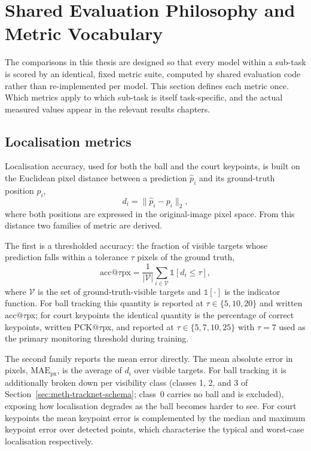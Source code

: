 \section{Shared Evaluation Philosophy and Metric Vocabulary}
\label{sec:meth-metrics}

The comparisons in this thesis are designed so that every model within a
sub-task is scored by an identical, fixed metric suite, computed by shared
evaluation code rather than re-implemented per model. This section defines each
metric once. Which metrics apply to which sub-task is itself task-specific, and
the actual measured values appear in the relevant results chapters. 

\subsection{Localisation metrics}
\label{sec:meth-metrics-loc}

Localisation accuracy, used for both the ball and the court keypoints, is built
on the Euclidean pixel distance between a prediction $\hat{p}_i$ and its
ground-truth position $p_i$,
\begin{equation}
  d_i = \lVert \hat{p}_i - p_i \rVert_2,
  \label{eq:pixdist}
\end{equation}
where both positions are expressed in the original-image pixel space. From this
distance two families of metric are derived.

The first is a thresholded accuracy: the fraction of visible targets whose
prediction falls within a tolerance $\tau$ pixels of the ground truth,
\begin{equation}
  \mathrm{acc@}\tau\mathrm{px} = \frac{1}{|\mathcal{V}|}\sum_{i \in \mathcal{V}}
  \mathbb{1}\!\left[ d_i \le \tau \right],
  \label{eq:accthr}
\end{equation}
where $\mathcal{V}$ is the set of ground-truth-visible targets and
$\mathbb{1}[\cdot]$ is the indicator function. For ball tracking this quantity
is reported at $\tau \in \{5, 10, 20\}$ and written $\mathrm{acc@}\tau$px; for
court keypoints the identical quantity is the percentage of correct keypoints,
written $\mathrm{PCK@}\tau$px, and reported at $\tau \in \{5, 7, 10, 25\}$ with
$\tau = 7$ used as the primary monitoring threshold during training.

The second family reports the mean error directly. The mean absolute error in
pixels, $\mathrm{MAE_{px}}$, is the average of $d_i$ over visible targets. For
ball tracking it is additionally broken down per visibility class (classes 1, 2,
and 3 of Section~\ref{sec:meth-tracknet-schema}; class~0 carries no ball and is
excluded), exposing how localisation degrades as the ball becomes harder to see.
For court keypoints the mean keypoint error is complemented by the median and
maximum keypoint error over detected points, which characterise the typical and
worst-case localisation respectively.

